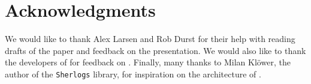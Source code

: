 \documentclass{juliacon}
\begin{document}
\section{Acknowledgments}

We would like to thank Alex Larsen and Rob Durst for their help with reading drafts of the paper and feedback on the presentation.
We would also like to thank the developers of  for feedback on \FlowFPX{}.
Finally, many thanks to Milan Klöwer, the author of the \texttt{Sherlogs} library, for inspiration on the architecture of \FT{}.


\end{document}
